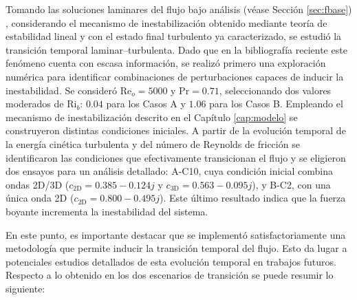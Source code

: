 Tomando las soluciones laminares del flujo bajo análisis (véase Sección \ref{sec:fbase}) \cite{tao1960, chen1996linear}, considerando el mecanismo de inestabilización obtenido mediante teoría de estabilidad lineal \cite{schlatter2005} y con el estado final turbulento ya caracterizado, se estudió la transición temporal laminar–turbulenta. Dado que en la bibliografía reciente este fenómeno cuenta con escasa información, se realizó primero una exploración numérica para identificar combinaciones de perturbaciones capaces de inducir la inestabilidad. Se consideró $\text{Re}_o=5000$ y $\text{Pr}=0\text{.}71$, seleccionando dos valores moderados de $\text{Ri}_b$: $0\text{.}04$ para los Casos A y $1\text{.}06$ para los Casos B. Empleando el mecanismo de inestabilización descrito en el Capítulo \ref{cap:modelo} se construyeron distintas condiciones iniciales. A partir de la evolución temporal de la energía cinética turbulenta y del número de Reynolds de fricción se identificaron las condiciones que efectivamente transicionan el flujo y se eligieron dos ensayos para un análisis detallado: A-C10, cuya condición inicial combina ondas 2D/3D ($c_{\text{2D}}=0\text{.}385 - 0\text{.}124 j$ y $c_{\text{3D}}=0\text{.}563 - 0\text{.}095 j$), y B-C2, con una única onda 2D ($c_{\text{2D}}=0\text{.}800 - 0\text{.}495 j$). Este último resultado indica que la fuerza boyante incrementa la inestabilidad del sistema. 

En este punto, es importante destacar que se implementó satisfactoriamente una \linebreak metodología que permite inducir la transición temporal del flujo. Esto da lugar a potenciales estudios detallados de esta evolución temporal en trabajos futuros. Respecto a lo obtenido en los dos escenarios de transición se puede resumir lo siguiente:

